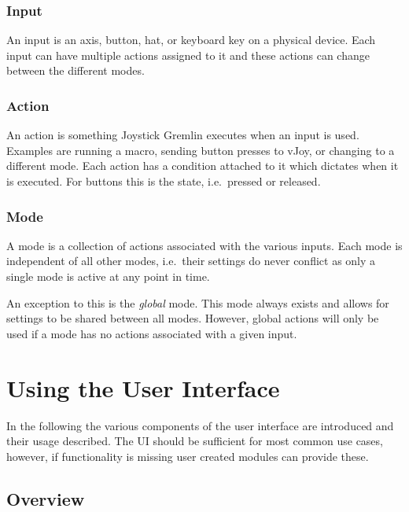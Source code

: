 \documentclass[a4, 10pt]{article}
\newcommand{\JG}{Joystick Gremlin}
\begin{document}
\subsubsection{Input}
An input is an axis, button, hat, or keyboard key on a physical device.
Each input can have multiple actions assigned to it and these actions
can change between the different modes.

\subsubsection{Action}
An action is something \JG{} executes when an input is used. Examples
are running a macro, sending button presses to vJoy, or changing to a
different mode. Each action has a condition attached to it which
dictates when it is executed. For buttons this is the state, i.e.\
pressed or released.

\subsubsection{Mode}
A mode is a collection of actions associated with the various inputs.
Each mode is independent of all other modes, i.e.\ their settings do
never conflict as only a single mode is active at any point in time.

An exception to this is the \emph{global} mode. This mode always exists
and allows for settings to be shared between all modes. However, global
actions will only be used if a mode has no actions associated with a
given input.



\section{Using the User Interface}
\label{sec:gui}

In the following the various components of the user interface are
introduced and their usage described. The UI should be sufficient for
most common use cases, however, if functionality is missing user created
modules can provide these.


\subsection{Overview}
\end{document}
